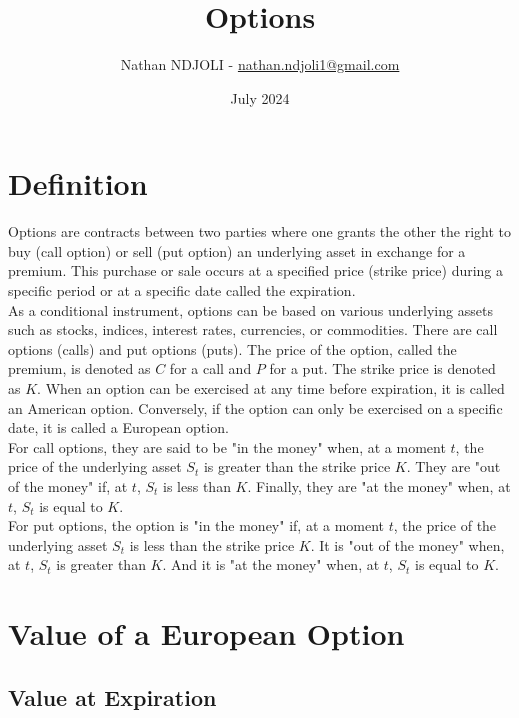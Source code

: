 \documentclass[a4paper,10pt]{article}
\title{Options}
\author{Nathan NDJOLI - \href{mailto:nathan.ndjoli1@gmail.com}{nathan.ndjoli1@gmail.com}}
\date{July 2024}
\begin{document}
\maketitle

\section*{Definition}

    \noindent Options are contracts between two parties where one grants the other the right to buy (call option) or sell (put option) an underlying asset in exchange for a premium. This purchase or sale occurs at a specified price (strike price) during a specific period or at a specific date called the expiration. \\
    
    \noindent As a conditional instrument, options can be based on various underlying assets such as stocks, indices, interest rates, currencies, or commodities. There are call options (calls) and put options (puts). The price of the option, called the premium, is denoted as \( C \) for a call and \( P \) for a put. The strike price is denoted as \( K \). When an option can be exercised at any time before expiration, it is called an American option. Conversely, if the option can only be exercised on a specific date, it is called a European option. \\
    
    \noindent For call options, they are said to be "in the money" when, at a moment \( t \), the price of the underlying asset \( S_t \) is greater than the strike price \( K \). They are "out of the money" if, at \( t \), \( S_t \) is less than \( K \). Finally, they are "at the money" when, at \( t \), \( S_t \) is equal to \( K \). \\
    
    \noindent For put options, the option is "in the money" if, at a moment \( t \), the price of the underlying asset \( S_t \) is less than the strike price \( K \). It is "out of the money" when, at \( t \), \( S_t \) is greater than \( K \). And it is "at the money" when, at \( t \), \( S_t \) is equal to \( K \). \\
    
\section*{Value of a European Option}

    \subsection*{Value at Expiration}
\end{document}
